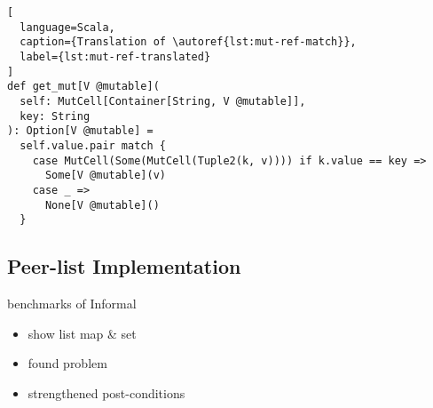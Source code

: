 \begin{lstlisting}[
  language=Scala,
  caption={Translation of \autoref{lst:mut-ref-match}},
  label={lst:mut-ref-translated}
]
def get_mut[V @mutable](
  self: MutCell[Container[String, V @mutable]],
  key: String
): Option[V @mutable] =
  self.value.pair match {
    case MutCell(Some(MutCell(Tuple2(k, v)))) if k.value == key =>
      Some[V @mutable](v)
    case _ =>
      None[V @mutable]()
  }
\end{lstlisting}

\subsection{Peer-list Implementation}
\label{peerlist}

benchmarks of Informal

\begin{itemize}
  \item show list map \& set
  \item found problem
  \item strengthened post-conditions
\end{itemize}
